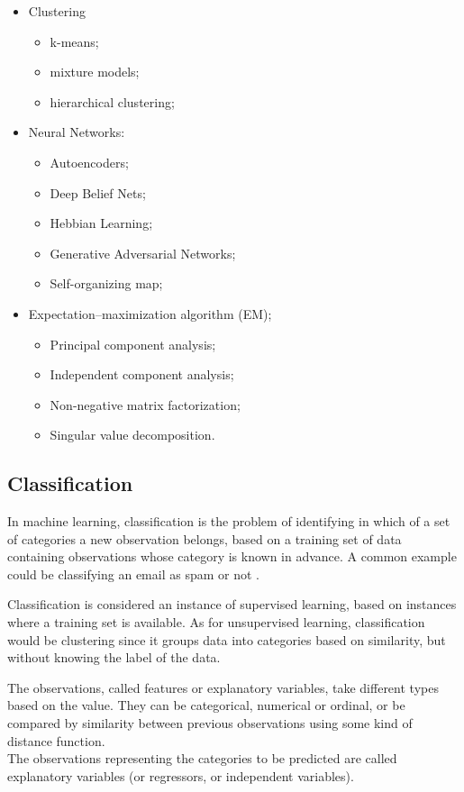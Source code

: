 \begin{itemize}[noitemsep]
	\item Clustering
	\begin{itemize}[noitemsep]
		\item k-means;
		\item mixture models;
		\item hierarchical clustering;
	\end{itemize}
	\item Neural Networks:
	\begin{itemize}[noitemsep]
		\item Autoencoders;
		\item Deep Belief Nets;
		\item Hebbian Learning;
		\item Generative Adversarial Networks;
		\item Self-organizing map;
	\end{itemize}
	\item Expectation–maximization algorithm (EM);
	\begin{itemize}[noitemsep]
		\item Principal component analysis;
		\item Independent component analysis;
		\item Non-negative matrix factorization;
		\item Singular value decomposition.
	\end{itemize}
\end{itemize}

\subsection{Classification} \label{classification}
In machine learning, classification is the problem of identifying in which of a set of categories a new observation belongs, based on a training set of data containing observations whose category is known in advance. A common example could be classifying an email as spam or not \cite{wiki:classification}.

Classification is considered an instance of supervised learning, based on instances where a training set is available. As for unsupervised learning, classification would be clustering since it groups data into categories based on similarity, but without knowing the label of the data.

The observations, called features or explanatory variables, take different types based on the value. They can be categorical, numerical or ordinal, or be compared by similarity between previous observations using some kind of distance function.\\
The observations representing the categories to be predicted are called explanatory variables (or regressors, or independent variables).


